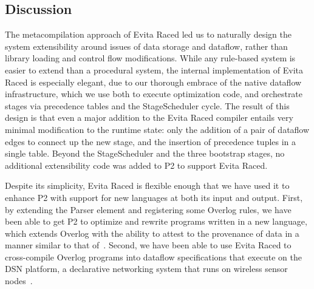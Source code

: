 \documentclass{sigmod08}
\begin{document}
\subsection{Discussion}
The metacompilation approach of Evita Raced led us to naturally design the system extensibility around issues of data storage and dataflow, rather than library loading and control flow modifications.  While any rule-based system is easier to extend than a procedural system, the internal implementation of Evita Raced is especially elegant, due to our thorough embrace of the native dataflow infrastructure, which we use both to execute optimization code, and orchestrate stages via precedence tables and the StageScheduler cycle.  The result of this design is that
even a major addition to the Evita Raced compiler entails very minimal
modification to the runtime state: only the addition of a pair of
dataflow edges to connect up the new stage, and the insertion of
precedence tuples in a single table.  Beyond the StageScheduler and the three bootstrap stages, no additional extensibility code was added to P2 to support Evita Raced.

Despite its simplicity, Evita Raced is flexible enough that we have used it to enhance P2 with support for new languages at both its input and output.  First, by extending the Parser element and registering some Overlog rules, we have been able to get P2  to optimize and rewrite programs written in a new language, which extends Overlog with the ability to attest to the provenance of data in a manner similar to that of~\cite{abadi-netdb07}.  Second, we have been able to use Evita Raced to cross-compile Overlog programs into dataflow specifications that execute on the DSN platform, a declarative networking system that runs on wireless sensor nodes~\cite{chu-sensys07}.
\end{document}
